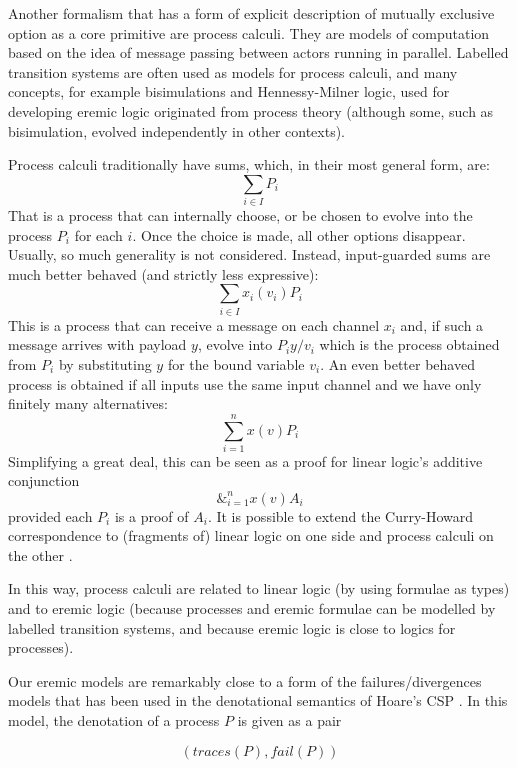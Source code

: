 Another formalism that has a form of explicit description of mutually
exclusive option as a core primitive are process calculi. They are
models of computation based on the idea of message passing between
actors running in parallel. Labelled transition systems are often used
as models for process calculi, and many concepts, for example
bisimulations and Hennessy-Milner logic, used for developing eremic
logic originated from process theory (although some, such as
bisimulation, evolved independently in other contexts).

Process calculi traditionally have sums, which, in their most general
form, are:
\[
     \sum_{i \in I} P_i
\]
That is a process that can internally choose, or be chosen to evolve
into the process $P_i$ for each $i$. Once the choice is made, all
other options disappear.  Usually, so much generality is not
considered. Instead, input-guarded sums are much better behaved (and
strictly less expressive):
  \[
     \sum_{i \in I} x_{i}(v_i)P_i
  \]
This is a process that can receive a message on each channel $x_i$
and, if such a message arrives with payload $y$, evolve into
$P_i{y/v_i}$ which is the process obtained from $P_i$ by substituting
$y$ for the bound variable $v_i$.  An even better behaved process is
obtained if all inputs use the same input channel and we have only
finitely many alternatives:
  \[
     \sum_{i = 1}^n x(v)P_i
  \]
  Simplifying a great deal, this can be seen as a proof for linear
  logic's additive conjunction
  \[
     \&_{i = 1}^n x(v)A_i
  \]
  provided each $P_i$ is a proof of $A_i$.  It is possible to extend
  the Curry-Howard correspondence to (fragments of) linear logic on
  one side and process calculi on the other \cite{GaySJ:typcalosp}.

In this way, process calculi are related to linear logic (by using
formulae as types) and to eremic logic (because processes and eremic
formulae can be modelled by labelled transition systems, and because
eremic logic is close to logics for processes).

Our eremic models are remarkably close to a form of the
failures/divergences models that has been used in the denotational
semantics of Hoare's CSP \cite{HoareC:comseq,RoscoeAW:theapoc}.  In
this model, the denotation of a process $P$ is given as a pair

\[
   (traces(P), fail(P))
\]

